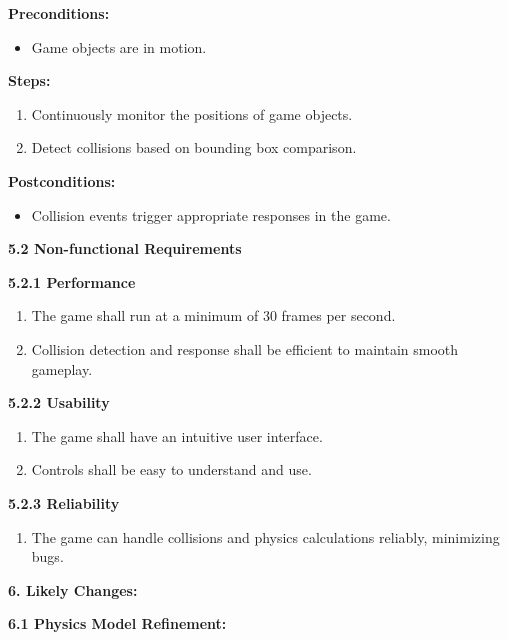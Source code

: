 \documentclass[
]{article}
\begin{document}
\textbf{Preconditions:}

\begin{itemize}
\item
  Game objects are in motion.
\end{itemize}

\textbf{Steps:}

\begin{enumerate}
\def\labelenumi{\arabic{enumi}.}
\item
  Continuously monitor the positions of game objects.
\item
  Detect collisions based on bounding box comparison.
\end{enumerate}

\textbf{Postconditions:}

\begin{itemize}
\item
  Collision events trigger appropriate responses in the game.
\end{itemize}

\textbf{5.2 Non-functional Requirements}

\textbf{5.2.1 Performance}

\begin{enumerate}
\def\labelenumi{\arabic{enumi}.}
\item
  The game shall run at a minimum of 30 frames per second.
\item
  Collision detection and response shall be efficient to maintain smooth
  gameplay.
\end{enumerate}

\textbf{5.2.2 Usability}

\begin{enumerate}
\def\labelenumi{\arabic{enumi}.}
\item
  The game shall have an intuitive user interface.
\item
  Controls shall be easy to understand and use.
\end{enumerate}

\textbf{5.2.3 Reliability}

\begin{enumerate}
\def\labelenumi{\arabic{enumi}.}
\item
  The game can handle collisions and physics calculations reliably,
  minimizing bugs.
\end{enumerate}

\textbf{6. Likely Changes:}

\textbf{6.1 Physics Model Refinement:}
\end{document}
